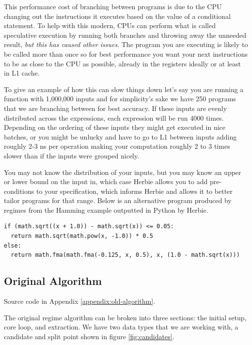 \documentclass{article}
\begin{document}
This performance cost of branching between programs is due to the CPU changing out the instructions it executes based on the value of a conditional statement. To help with this modern, CPUs can perform what is called speculative execution by running both branches and throwing away the unneeded result, \textit{but this has caused other issues}. The program you are executing is likely to be called more than once so for best performance you want your next instructions to be as close to the CPU as possible, already in the registers ideally or at least in L1 cache.

To give an example of how this can slow things down let's say you are running a function with 1,000,000 inputs and for simplicity's sake we have 250 programs that we are branching between for best accuracy. If these inputs are evenly distributed across the expressions, each expression will be run 4000 times. Depending on the ordering of these inputs they might get executed in nice batches, or you might be unlucky and have to go to L1 between inputs adding roughly 2-3 ns per operation making your computation roughly 2 to 3 times slower than if the inputs were grouped nicely. 

You may not know the distribution of your inputs, but you may know an upper or lower bound on the input in, which case Herbie allows you to add pre-conditions to your specification, which informs Herbie and allows it to better tailor programs for that range. Below is an alternative program produced by regimes from the Hamming example outputted in Python by Herbie. 

\begin{center}
\begin{lstlisting}
if (math.sqrt((x + 1.0)) - math.sqrt(x)) <= 0.05:
  return math.sqrt(math.pow(x, -1.0)) * 0.5
else:
  return math.fma(math.fma(-0.125, x, 0.5), x, (1.0 - math.sqrt(x)))
\end{lstlisting}
\end{center}

\subsection{Original Algorithm}

Source code in Appendix \ref{appendix:old-algorithm}.

The original regime algorithm can be broken into three sections: the initial setup, core loop, and extraction. We have two data types that we are working with, a candidate and split point shown in figure \ref{fig:candidates}. 
\end{document}
